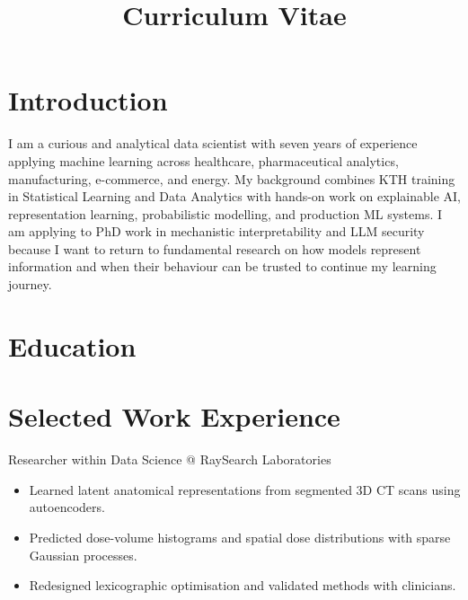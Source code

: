 \documentclass[11pt,a4paper]{moderncv}
\title{Curriculum Vitae}
\begin{document}
\makecvtitle

\section*{Introduction}
I am a curious and analytical data scientist with seven years of experience applying machine learning across healthcare, pharmaceutical analytics, manufacturing, e-commerce, and energy. My background combines KTH training in Statistical Learning and Data Analytics with hands-on work on explainable AI, representation learning, probabilistic modelling, and production ML systems. I am applying to PhD work in mechanistic interpretability and LLM security because I want to return to fundamental research on how models represent information and when their behaviour can be trusted to continue my learning journey.

\section{Education}




\section{Selected Work Experience}

\large{Researcher within Data Science @ RaySearch Laboratories}
\normalsize
\begin{itemize}
    \item Learned latent anatomical representations from segmented 3D CT scans using autoencoders.
    \item Predicted dose-volume histograms and spatial dose distributions with sparse Gaussian processes.
    \item Redesigned lexicographic optimisation and validated methods with clinicians.
\end{itemize}
\end{document}
